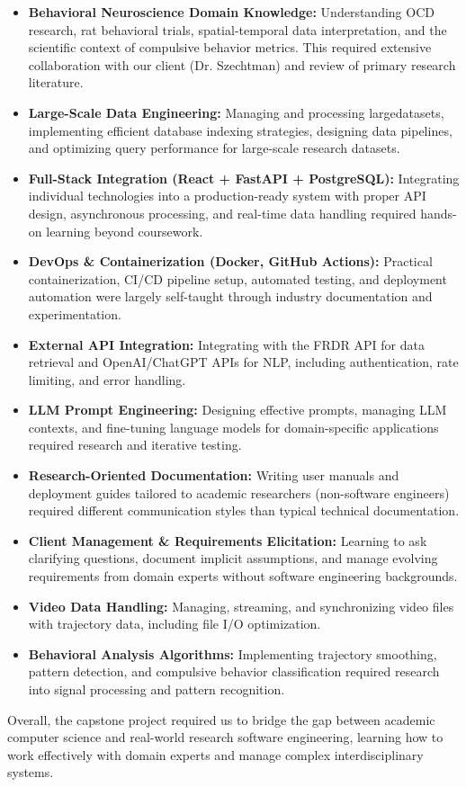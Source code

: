 \documentclass{article}
\begin{document}
\begin{itemize}
    \item \textbf{Behavioral Neuroscience Domain Knowledge:} Understanding OCD research, rat behavioral trials, spatial-temporal data interpretation, and the scientific context of compulsive behavior metrics. This required extensive collaboration with our client (Dr. Szechtman) and review of primary research literature.
    
    \item \textbf{Large-Scale Data Engineering:} Managing and processing largedatasets, implementing efficient database indexing strategies, designing data pipelines, and optimizing query performance for large-scale research datasets.
    
    \item \textbf{Full-Stack Integration (React + FastAPI + PostgreSQL):} Integrating individual technologies into a production-ready system with proper API design, asynchronous processing, and real-time data handling required hands-on learning beyond coursework.
    
    \item \textbf{DevOps \& Containerization (Docker, GitHub Actions):} Practical containerization, CI/CD pipeline setup, automated testing, and deployment automation were largely self-taught through industry documentation and experimentation.
    
    \item \textbf{External API Integration:} Integrating with the FRDR API for data retrieval and OpenAI/ChatGPT APIs for NLP, including authentication, rate limiting, and error handling.
    
    \item \textbf{LLM Prompt Engineering:} Designing effective prompts, managing LLM contexts, and fine-tuning language models for domain-specific applications required research and iterative testing.
    
    \item \textbf{Research-Oriented Documentation:} Writing user manuals and deployment guides tailored to academic researchers (non-software engineers) required different communication styles than typical technical documentation.
    
    \item \textbf{Client Management \& Requirements Elicitation:} Learning to ask clarifying questions, document implicit assumptions, and manage evolving requirements from domain experts without software engineering backgrounds.
    
    \item \textbf{Video Data Handling:} Managing, streaming, and synchronizing video files with trajectory data, including file I/O optimization.
    
    \item \textbf{Behavioral Analysis Algorithms:} Implementing trajectory smoothing, pattern detection, and compulsive behavior classification required research into signal processing and pattern recognition.
\end{itemize}

\par{Overall, the capstone project required us to bridge the gap between academic computer science and real-world research software engineering, learning how to work effectively with domain experts and manage complex interdisciplinary systems.}
\end{document}
